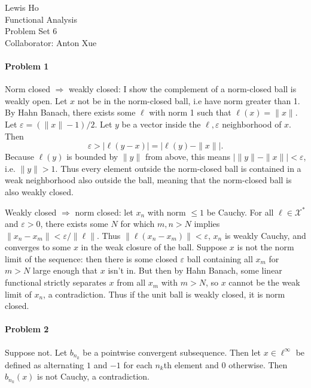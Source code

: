 \documentclass[12pt]{article}
\newcommand{\X}{\mathcal{X}}
\begin{document}
\begin{center}
  Lewis Ho\\
  Functional Analysis\\
  Problem Set 6\\
  Collaborator: Anton Xue
\end{center}

\paragraph{Problem 1}

Norm closed $\Rightarrow$ weakly closed: I show the complement of a norm-closed
ball is weakly open. Let $x$ not be in the norm-closed ball, i.e have norm
greater than 1. By Hahn Banach, there
exists some $\ell$ with norm 1 such that $\ell(x) = \|x\|$. Let $\varepsilon =
(\|x\|-1)/2$. Let $y$ be a vector inside the $\ell, \varepsilon$ neighborhood
of $x$. Then
\begin{displaymath}
  \varepsilon > |\ell(y-x)| = |\ell(y) - \|x\||.
\end{displaymath}
Because $\ell(y)$ is bounded by $\|y\|$ from above, this means $|\|y\|-\|x\||<
\varepsilon$, i.e. $\|y\| > 1$. Thus every element outside the norm-closed ball
is contained in a weak neighborhood also outside the ball, meaning that the
norm-closed ball is also weakly closed.

Weakly closed $\Rightarrow$ norm closed: let $x_n$ with norm $\leq 1$ be Cauchy.
For all $\ell \in \X^*$ and $\varepsilon > 0$, there exists some $N$ for which
$m,n > N$ implies $\|x_n-x_m\| < \varepsilon/\|\ell\|$. Thus $\|\ell(x_n-x_m)\|
<\varepsilon$, $x_n$ is weakly Cauchy, and converges to some $x$ in the weak
closure of the ball. Suppose $x$ is not the norm limit of the sequence: then
there is some closed $\varepsilon$ ball containing all $x_m$ for $m>N$ large
enough that $x$ isn't in. But then by Hahn Banach, some linear functional
strictly separates $x$ from all $x_m$ with $m>N$, so $x$ cannot be the weak limit
of $x_n$, a contradiction. Thus if the unit ball is weakly closed, it is norm
closed.

\paragraph{Problem 2}

Suppose not. Let $b_{n_k}$ be a pointwise convergent subsequence. Then let $x\in
\ell^\infty$ be defined as alternating $1$ and $-1$ for each $n_k$th element and
0 otherwise. Then $b_{n_k}(x)$ is not Cauchy, a contradiction.
\end{document}
